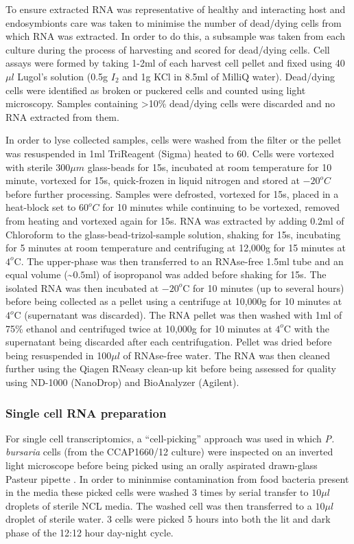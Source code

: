 To ensure extracted RNA was representative of healthy and interacting host 
and endosymbionts care was taken to minimise the number of dead/dying cells 
from which RNA was extracted.  In order to do this, a subsample was taken 
from each culture during the process of harvesting and scored for dead/dying cells.  
Cell assays were formed by taking 1-2ml of each harvest cell pellet and 
fixed using 40\(\mu l\) Lugol's solution (0.5g \(I_{2}\) and 1g KCl in 8.5ml 
of MilliQ water). Dead/dying cells were identified as broken or puckered cells 
and counted using light microscopy.  Samples containing >10\% dead/dying cells 
were discarded and no RNA extracted from them.

In order to lyse collected samples, cells were washed from the filter or the 
pellet was resuspended in 1ml TriReagent (Sigma) heated to \(60\)\celsius. 
Cells were vortexed with sterile \(300\mu m\) glass-beads for 15s, incubated at 
room temperature for 10 minute, vortexed for 15s, quick-frozen in liquid 
nitrogen and stored at \(-20^{o}C\) before further processing.  
Samples were defrosted, vortexed for 15s, placed in a heat-block set 
to \(60^{o}C\) for 10 minutes while continuing to be vortexed, removed from 
heating and vortexed again for 15s.  
RNA was extracted by adding 0.2ml of Chloroform to the glass-bead-trizol-sample 
solution, shaking for 15s, incubating for 5 minutes at room temperature and 
centrifuging at 12,000g for 15 minutes at $4^{o}$C.  
The upper-phase was then transferred to an RNAse-free 1.5ml tube and an 
equal volume (\textasciitilde$0.5$ml) of isopropanol was added before shaking for 15s.  
The isolated RNA was then incubated at $-20^{o}$C for 10 minutes 
(up to several hours) before being collected as a pellet using a centrifuge at 
10,000g for 10 minutes at $4^{o}$C (supernatant was discarded). 
The RNA pellet was then washed with 1ml of 75\% ethanol and centrifuged 
twice at 10,000g for 10 minutes at $4^{o}$C with the supernatant being 
discarded after each centrifugation.  
Pellet was dried before being resuspended in 100$\mu l$ of RNAse-free water.  
The RNA was then cleaned further using the Qiagen RNeasy clean-up kit 
before being assessed for quality using ND-1000 (NanoDrop) and BioAnalyzer (Agilent).


\subsubsection{Single cell RNA preparation}
For single cell transcriptomics, a ``cell-picking'' approach was used in which
\textit{P. bursaria} cells (from the CCAP1660/12 culture) were inspected on an inverted light microscope 
before being picked using an orally aspirated drawn-glass Pasteur pipette \citep{Garcia-Cuetos2012}.
In order to mininmise contamination from food bacteria present in the media these picked cells
were washed 3 times by serial transfer to \(10\mu l\) droplets of sterile NCL media.
The washed cell was then transferred to a \(10\mu l\) droplet of sterile water.
3 cells were picked 5 hours into both the lit and dark phase of the 12:12 hour day-night cycle.

